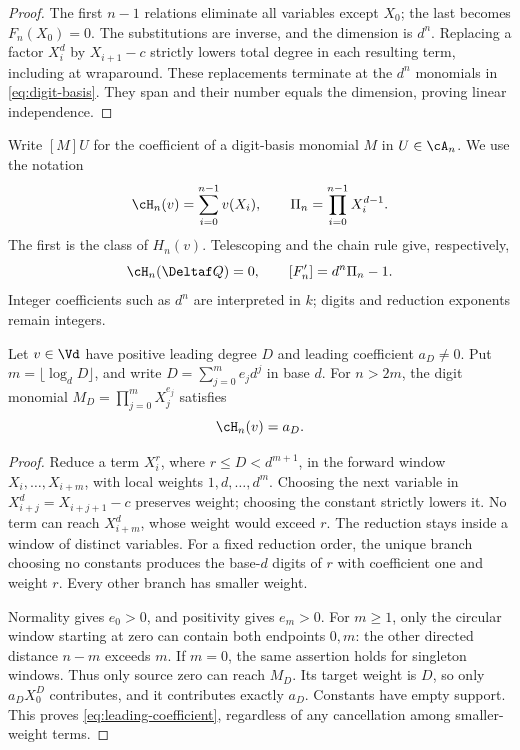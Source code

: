 \begin{proof}
The first $n-1$ relations eliminate all variables except $X_0$;
the last becomes $F_n(X_0)=0$. The substitutions are inverse,
and the dimension is $d^n$. Replacing a factor $X_i^d$ by
$X_{i+1}-c$ strictly lowers total degree in each resulting term,
including at wraparound. These replacements terminate at the
$d^n$ monomials in \eqref{eq:digit-basis}. They span and their
number equals the dimension, proving linear independence.
\end{proof}

Write $[M]U$ for the coefficient of a digit-basis monomial $M$
in $U\in\cA_n$. We use the notation
\begin{equation}
 \cH_n(v)=\sum_{i=0}^{n-1}v(X_i),\qquad
 \Pi_n=\prod_{i=0}^{n-1}X_i^{d-1}.
 \label{eq:class-notation}
\end{equation}
The first is the class of $H_n(v)$. Telescoping and the chain
rule give, respectively,
\begin{equation}
 \cH_n(\Deltaf Q)=0,\qquad [F_n']=d^n\Pi_n-1.
 \label{eq:telescoping-jacobian}
\end{equation}
Integer coefficients such as $d^n$ are interpreted in $k$;
digits and reduction exponents remain integers.

\begin{lemma}
\label{lem:leading}
Let $v\in\Vd$ have positive leading degree $D$ and leading
coefficient $a_D\ne0$. Put $m=\lfloor\log_dD\rfloor$, and
write $D=\sum_{j=0}^m e_jd^j$ in base $d$. For $n>2m$,
the digit monomial $M_D=\prod_{j=0}^mX_j^{e_j}$ satisfies
\begin{equation}
 [M_D]\cH_n(v)=a_D.
 \label{eq:leading-coefficient}
\end{equation}
\end{lemma}

\begin{proof}
Reduce a term $X_i^r$, where $r\le D<d^{m+1}$, in the forward
window $X_i,\ldots,X_{i+m}$, with local weights
$1,d,\ldots,d^m$. Choosing the next variable in
$X_{i+j}^d=X_{i+j+1}-c$ preserves weight; choosing the constant
strictly lowers it. No term can reach $X_{i+m}^d$, whose weight
would exceed $r$. The reduction stays inside a window of distinct
variables. For a fixed reduction order, the unique branch choosing
no constants produces the base-$d$ digits of $r$ with coefficient
one and weight $r$. Every other branch has smaller weight.

Normality gives $e_0>0$, and positivity gives $e_m>0$.
For $m\ge1$, only the circular window starting at zero can
contain both endpoints $0,m$: the other directed distance
$n-m$ exceeds $m$. If $m=0$, the same assertion holds for
singleton windows. Thus only source zero can reach $M_D$.
Its target weight is $D$, so only $a_DX_0^D$ contributes,
and it contributes exactly $a_D$. Constants have empty support.
This proves \eqref{eq:leading-coefficient}, regardless of any
cancellation among smaller-weight terms.
\end{proof}

